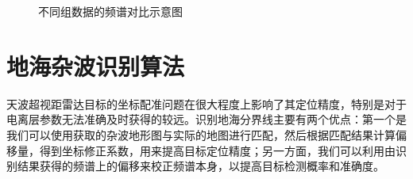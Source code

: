 \begin{figure}[H]
	\centering
	\hfil

	\hfil
	\caption{不同组数据的频谱对比示意图}
	\label{fig:group}
\end{figure}

\section{地海杂波识别算法}
天波超视距雷达目标的坐标配准问题在很大程度上影响了其定位精度，特别是对于电离层参数无法准确及时获得的较远。识别地海分界线主要有两个优点：第一个是我们可以使用获取的杂波地形图与实际的地图进行匹配，然后根据匹配结果计算偏移量，得到坐标修正系数，用来提高目标定位精度；另一方面，我们可以利用由识别结果获得的频谱上的偏移来校正频谱本身，以提高目标检测概率和准确度。


